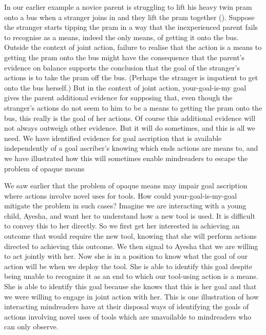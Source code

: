 \documentclass[12pt,a4paper]{extarticle}
\begin{document}
In our earlier example 
a novice parent is struggling to lift his heavy twin pram onto a bus when a stranger joins in and they lift the pram together ().
Suppose the stranger starts tipping the pram in a way that the inexperienced parent fails to recognise as a means, indeed the only means, of getting it onto the bus.
Outside the context of joint action, 
failure to realise that the action is a means to getting the pram onto the bus
might have the consequence that
the parent's evidence on balance supports the conclusion that the goal of the stranger's actions is to take the pram off the bus.
(Perhaps the stranger is impatient to get onto the bus herself.)
But in the context of joint action,
your-goal-is-my goal gives the parent  additional evidence for supposing that, 
even though the stranger's actions do not seem to him to be a means to getting the pram onto the bus, 
this really is the goal of her actions.
Of course this additional evidence will not always outweigh   other evidence.
But it will do sometimes, and this is all we need.
We have identified evidence for goal ascription that is available independently of a goal ascriber's knowing which ends actions are means to, and we have illustrated how this will sometimes enable mindreaders to escape the problem of opaque means
 

We saw earlier that the problem of opaque means  may impair goal ascription where actions involve novel uses for tools.
How could your-goal-is-my-goal mitigate the problem in such cases?
Imagine we are interacting with a young child,
Ayesha,
and want her to understand how a new tool is used.  
It is difficult to convey this to her directly.  
So we first get her interested in achieving an outcome that would require the new tool,
knowing that she will perform actions directed to achieving this outcome.  
We then signal to Ayesha that we are willing to act jointly with her.  
Now she is in a position to know what the goal of our action will be when we deploy the tool.  
She is able to identify this goal 
despite being unable to recognize it as an end to which our tool-using action is a means.
She is able to identify this goal 
because she knows that this is her goal
and that we were willing to engage in joint action with her.
This is one illustration of how 
interacting mindreaders have at their disposal ways of
identifying the goals of actions involving novel uses of tools
which are unavailable to mindreaders who can only observe.
\end{document}
